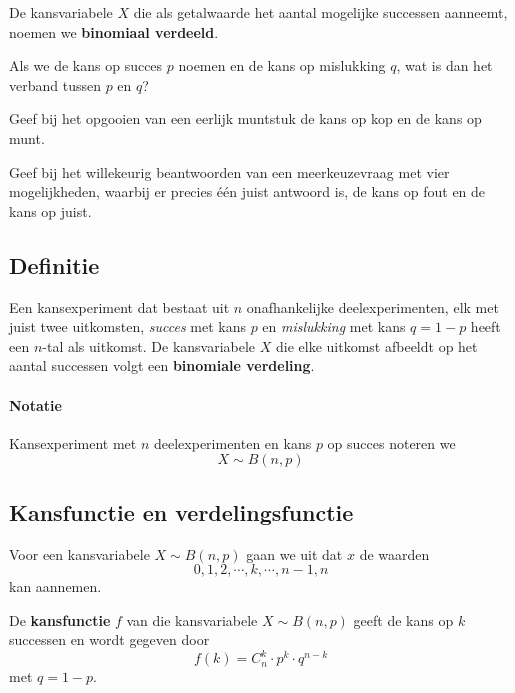 \documentclass[a4paper,12pt, twoside]{article}
\begin{document}
De kansvariabele $X$ die als getalwaarde het aantal mogelijke successen aanneemt, noemen we {\bf binomiaal verdeeld}.

\begin{oefening}
  Als we de kans op succes $p$ noemen en de kans op mislukking $q$, wat is dan het verband tussen $p$ en $q$?
\end{oefening}
\begin{oefening}
  Geef bij het opgooien van een eerlijk muntstuk de kans op kop en de kans op munt.
\end{oefening}
\begin{oefening}
  Geef bij het willekeurig beantwoorden van een meerkeuzevraag met vier mogelijkheden, waarbij er precies één juist antwoord is, de kans op fout en de kans op juist.
\end{oefening}

\subsection{Definitie}

\begin{mdframed}
Een kansexperiment dat bestaat uit $n$ onafhankelijke deelexperimenten, elk met juist twee uitkomsten, {\em succes} met kans $p$ en {\em mislukking} met kans $q=1-p$ heeft een $n$-tal als uitkomst. De kansvariabele $X$ die elke uitkomst afbeeldt op het aantal successen volgt een {\bf binomiale verdeling}.
\end{mdframed}

\paragraph*{Notatie} Kansexperiment met $n$ deelexperimenten en kans $p$ op succes noteren we
$$X \sim B(n, p)$$

\subsection{Kansfunctie en verdelingsfunctie}


Voor een kansvariabele $X \sim B(n, p)$ gaan we uit dat $x$ de waarden $$0, 1, 2, \cdots, k, \cdots, n-1, n$$ kan aannemen.\\

\begin{mdframed}
De {\bf kansfunctie} $f$ van die kansvariabele $X \sim B(n, p)$ geeft de kans op $k$ successen en wordt gegeven door
$$ f(k)=C_n^k\cdot p^k\cdot q^{n-k}$$
met $q=1-p$.
\end{mdframed}
\vspace*{1cm}
\end{document}
